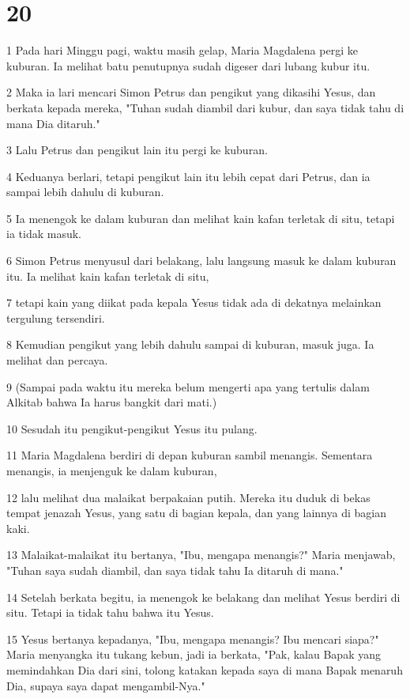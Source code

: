 \chapter{20}

\par 1 Pada hari Minggu pagi, waktu masih gelap, Maria Magdalena pergi ke kuburan. Ia melihat batu penutupnya sudah digeser dari lubang kubur itu.
\par 2 Maka ia lari mencari Simon Petrus dan pengikut yang dikasihi Yesus, dan berkata kepada mereka, "Tuhan sudah diambil dari kubur, dan saya tidak tahu di mana Dia ditaruh."
\par 3 Lalu Petrus dan pengikut lain itu pergi ke kuburan.
\par 4 Keduanya berlari, tetapi pengikut lain itu lebih cepat dari Petrus, dan ia sampai lebih dahulu di kuburan.
\par 5 Ia menengok ke dalam kuburan dan melihat kain kafan terletak di situ, tetapi ia tidak masuk.
\par 6 Simon Petrus menyusul dari belakang, lalu langsung masuk ke dalam kuburan itu. Ia melihat kain kafan terletak di situ,
\par 7 tetapi kain yang diikat pada kepala Yesus tidak ada di dekatnya melainkan tergulung tersendiri.
\par 8 Kemudian pengikut yang lebih dahulu sampai di kuburan, masuk juga. Ia melihat dan percaya.
\par 9 (Sampai pada waktu itu mereka belum mengerti apa yang tertulis dalam Alkitab bahwa Ia harus bangkit dari mati.)
\par 10 Sesudah itu pengikut-pengikut Yesus itu pulang.
\par 11 Maria Magdalena berdiri di depan kuburan sambil menangis. Sementara menangis, ia menjenguk ke dalam kuburan,
\par 12 lalu melihat dua malaikat berpakaian putih. Mereka itu duduk di bekas tempat jenazah Yesus, yang satu di bagian kepala, dan yang lainnya di bagian kaki.
\par 13 Malaikat-malaikat itu bertanya, "Ibu, mengapa menangis?" Maria menjawab, "Tuhan saya sudah diambil, dan saya tidak tahu Ia ditaruh di mana."
\par 14 Setelah berkata begitu, ia menengok ke belakang dan melihat Yesus berdiri di situ. Tetapi ia tidak tahu bahwa itu Yesus.
\par 15 Yesus bertanya kepadanya, "Ibu, mengapa menangis? Ibu mencari siapa?" Maria menyangka itu tukang kebun, jadi ia berkata, "Pak, kalau Bapak yang memindahkan Dia dari sini, tolong katakan kepada saya di mana Bapak menaruh Dia, supaya saya dapat mengambil-Nya."
